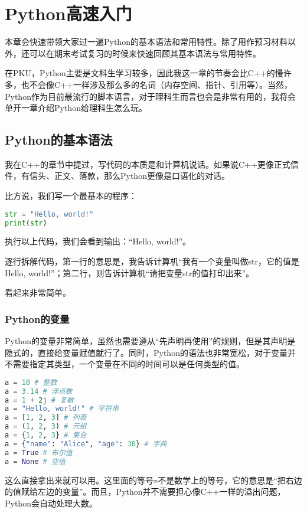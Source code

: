 \documentclass[../main.tex]{subfiles}
\begin{document}
\chapter{Python高速入门}

本章会快速带领大家过一遍Python的基本语法和常用特性。除了用作预习材料以外，还可以在期末考试复习的时候来快速回顾其基本语法与常用特性。

在PKU，Python主要是文科生学习较多，因此我这一章的节奏会比C++的慢许多，也不会像C++一样涉及那么多的名词（内存空间、指针、引用等）。当然，Python作为目前最流行的脚本语言，对于理科生而言也会是非常有用的，我将会单开一章介绍Python给理科生怎么玩。

\section{Python的基本语法}

我在C++的章节中提过，写代码的本质是和计算机说话。如果说C++更像正式信件，有信头、正文、落款，那么Python更像是口语化的对话。

比方说，我们写一个最基本的程序：

\begin{lstlisting}[language=python]
str = "Hello, world!"
print(str)
\end{lstlisting}

执行以上代码，我们会看到输出：“Hello, world!”。

逐行拆解代码，第一行的意思是，我告诉计算机“我有一个变量叫做str，它的值是Hello, world!”；第二行，则告诉计算机“请把变量str的值打印出来”。

看起来非常简单。

\subsection{Python的变量}

Python的变量非常简单，虽然也需要遵从“先声明再使用”的规则，但是其声明是隐式的，直接给变量赋值就行了。同时，Python的语法也非常宽松，对于变量并不需要指定其类型，一个变量在不同的时间可以是任何类型的值。

\begin{lstlisting}[language=python]
a = 10 # 整数
a = 3.14 # 浮点数
a = 1 + 2j # 复数
a = "Hello, world!" # 字符串
a = [1, 2, 3] # 列表
a = (1, 2, 3) # 元组
a = {1, 2, 3} # 集合
a = {"name": "Alice", "age": 30} # 字典
a = True # 布尔值
a = None # 空值
\end{lstlisting}
这么直接拿出来就可以用。这里面的等号\texttt{=}不是数学上的等号，它的意思是“把右边的值赋给左边的变量”。而且，Python并不需要担心像C++一样的溢出问题，Python会自动处理大数。
\end{document}
